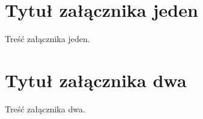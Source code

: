 \documentclass[openright]{xmgr}
\begin{document}
\appendix
\chapter{Tytuł załącznika jeden}

Treść załącznika jeden.

\chapter{Tytuł załącznika dwa}

Treść załącznika dwa.





\oswiadczenie
\end{document}
